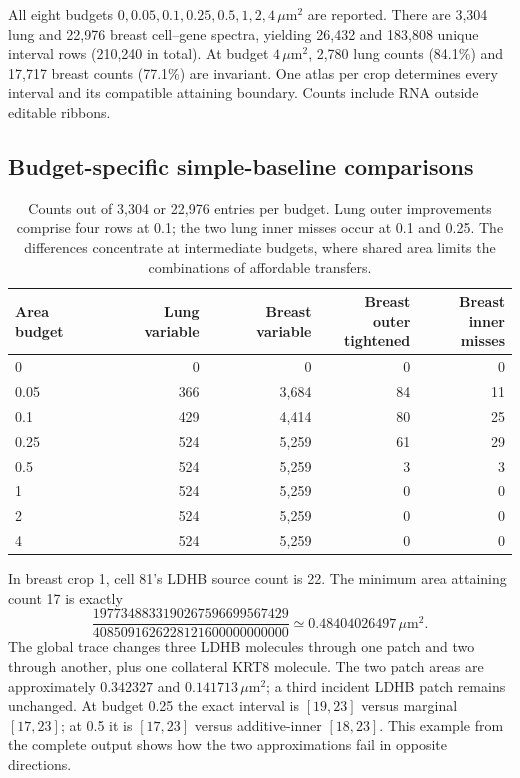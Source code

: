 \documentclass[10pt,letterpaper]{article}
\begin{document}
All eight budgets $0,0.05,0.1,0.25,0.5,1,2,4\,\mu\mathrm m^2$ are reported. There are 3,304 lung and 22,976 breast cell--gene spectra, yielding 26,432 and 183,808 unique interval rows (210,240 in total). At budget $4\,\mu\mathrm m^2$, 2,780 lung counts (84.1\%) and 17,717 breast counts (77.1\%) are invariant. One atlas per crop determines every interval and its compatible attaining boundary. Counts include RNA outside editable ribbons.

\FloatBarrier
\subsection{Budget-specific simple-baseline comparisons}
\begin{table}[ht]\centering
\begin{tabular}{lrrrr}\toprule
Area budget&Lung variable&Breast variable&\shortstack{Breast outer\\tightened}&\shortstack{Breast inner\\misses}\\\midrule
0&0&0&0&0\\
0.05&366&3,684&84&11\\
0.1&429&4,414&80&25\\
0.25&524&5,259&61&29\\
0.5&524&5,259&3&3\\
1&524&5,259&0&0\\
2&524&5,259&0&0\\
4&524&5,259&0&0\\\bottomrule
\end{tabular}
\caption{Counts out of 3,304 or 22,976 entries per budget. Lung outer improvements comprise four rows at 0.1; the two lung inner misses occur at 0.1 and 0.25. The differences concentrate at intermediate budgets, where shared area limits the combinations of affordable transfers.}
\end{table}

In breast crop 1, cell 81's LDHB source count is 22. The minimum area attaining count 17 is exactly
\[
 \frac{1977348833190267596699567429}{4085091626228121600000000000}
 \simeq0.48404026497\,\mu\mathrm m^2.
\]
The global trace changes three LDHB molecules through one patch and two through another, plus one collateral KRT8 molecule. The two patch areas are approximately $0.342327$ and $0.141713\,\mu\mathrm m^2$; a third incident LDHB patch remains unchanged. At budget 0.25 the exact interval is $[19,23]$ versus marginal $[17,23]$; at 0.5 it is $[17,23]$ versus additive-inner $[18,23]$. This example from the complete output shows how the two approximations fail in opposite directions.
\end{document}
